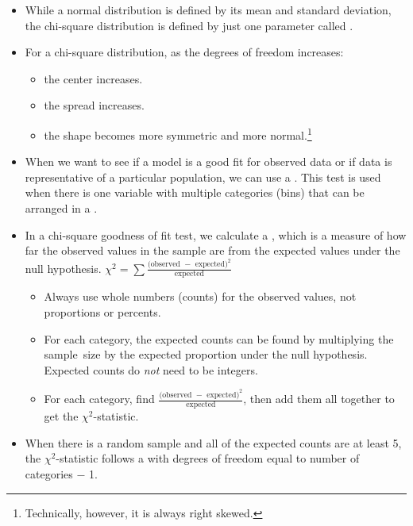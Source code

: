 \begin{itemize}

\item While a normal distribution is defined by its mean and standard deviation, the chi-square distribution is defined by just one parameter called .  
\item For a chi-square distribution, as the degrees of freedom increases:  \vspace{-1mm}
\begin{itemize}
\setlength{\itemsep}{0mm}
\item the center increases.\item  the spread increases.  
\item the shape becomes more symmetric and more normal.\footnote{Technically, however, it is always right skewed.}
\end{itemize}

\item When we want to see if a model is a good fit for observed data or if data is representative of a particular population, we can use a .  This test is used when there is one variable with multiple categories (bins) that can be arranged in a .

\item In a chi-square goodness of fit test, we calculate a , which is a measure of how far the observed values in the sample are from the expected values under the null hypothesis. $\chi^2 =\sum{ \frac{\text{(observed } - \text{ expected})^2}{\text{expected}}}$ 
\begin{itemize}\vspace{-1mm}
\item Always use whole numbers (counts) for the observed values, not proportions or percents.
\item For each category, the expected counts can be found by multiplying the sample~size by the expected proportion under the null hypothesis.  Expected counts do \emph{not} need to be integers.  
\item For each category, find $\frac{\text{(observed } - \text{ expected})^2}{\text{expected}}$, then add them all together to get the $\chi^2$-statistic.
\end{itemize}

\item When there is a random sample and all of the expected counts are at least 5, the $\chi^2$-statistic follows a  with degrees of freedom equal to number of categories $-$ 1.


\end{itemize}
